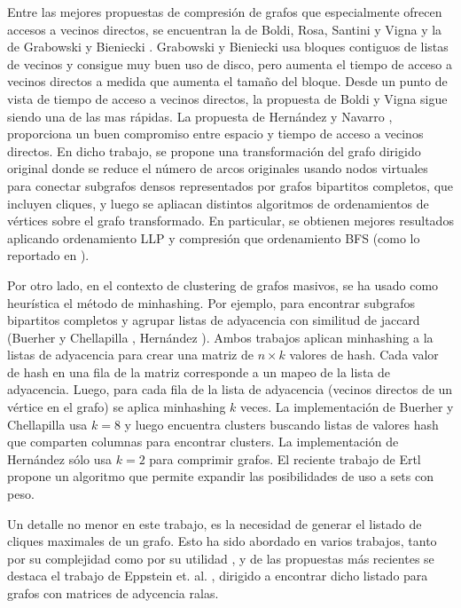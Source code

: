 Entre las mejores propuestas de compresión de grafos que especialmente ofrecen accesos a vecinos directos, se encuentran la de Boldi, Rosa, Santini y Vigna \cite{boldi2011layered} y la de Grabowski y Bieniecki \cite{maneth2016compressing}. Grabowski y Bieniecki usa bloques contiguos de listas de vecinos y consigue muy buen uso de disco, pero aumenta el tiempo de acceso a vecinos directos a medida que aumenta el tamaño del bloque. Desde un punto de vista de tiempo de acceso a vecinos directos, la propuesta de Boldi y Vigna sigue siendo una de las mas rápidas. La propuesta de Hernández y Navarro \cite{tesisCecilia}, proporciona un buen compromiso entre espacio y tiempo de acceso a vecinos directos. En dicho trabajo, se propone una transformación del grafo dirigido original donde se reduce el número de arcos originales usando nodos virtuales para conectar subgrafos densos representados por grafos bipartitos completos, que incluyen cliques, y luego se apliacan distintos algoritmos de ordenamientos de vértices sobre el grafo transformado. En particular, se obtienen mejores resultados aplicando ordenamiento LLP y compresión \cite{boldi2011layered} que ordenamiento BFS (como lo reportado en \cite{Hernandez2014}).

Por otro lado, en el contexto de clustering de grafos masivos, se ha usado como heurística el método de minhashing. Por ejemplo, para encontrar subgrafos bipartitos completos y agrupar listas de adyacencia con similitud de jaccard (Buerher y Chellapilla \cite{BuehrerChellapilla}, Hernández \cite{hernandez2012compressed}).
Ambos trabajos aplican minhashing a la listas de adyacencia para crear una matriz de $n \times k$ valores de hash. Cada valor de hash en una fila de la matriz corresponde a un mapeo de la lista de adyacencia. Luego, para cada fila de la lista de adyacencia (vecinos directos de un vértice en el grafo) se aplica minhashing $k$ veces. La implementación de Buerher y Chellapilla usa $k=8$ y luego encuentra clusters buscando listas de valores hash que comparten columnas para encontrar clusters. La implementación de Hernández \cite{hernandez2012compressed} sólo usa $k=2$ para comprimir grafos. El reciente trabajo de Ertl \cite{BagMinHash} propone un algoritmo que permite expandir las posibilidades de uso a sets con peso.

Un detalle no menor en este trabajo, es la necesidad de generar el listado de cliques maximales de un grafo. Esto ha sido abordado en varios trabajos, tanto por su complejidad como por su utilidad \cite{eblen2012maximum, hendrix2010theoretical, bomze1999maximum}, y de las propuestas más recientes se destaca el trabajo de Eppstein et. al. \cite{listingcliques,  listingcliques2}, dirigido a encontrar dicho listado para grafos con matrices de adycencia ralas.


